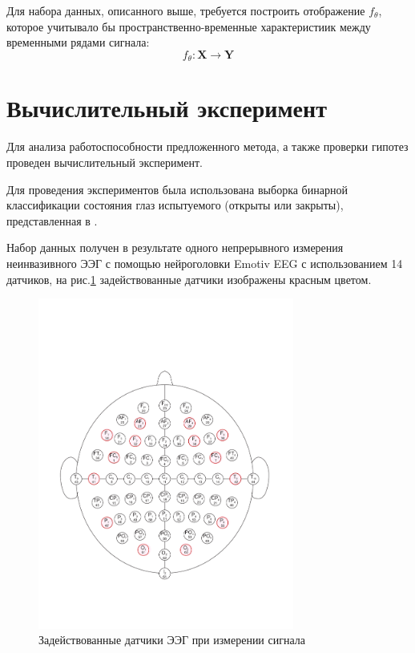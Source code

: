\documentclass[a4paper, 12pt]{extarticle}
\begin{document}
Для набора данных, описанного выше, требуется построить отображение $f_\theta$, которое учитывало 
бы пространственно-временные характеристиик между временными рядами сигнала:
$$f_\theta: \bm{X} \rightarrow \bm{Y}$$ 



\section{Вычислительный эксперимент}

Для анализа работоспособности предложенного метода, а также проверки гипотез
проведен вычислительный эксперимент.

Для проведения экспериментов была использована выборка бинарной классификации состояния глаз 
испытуемого (открыты или закрыты), представленная в \citep{misc_eeg_eye_state_264}.

Набор данных получен в результате одного непрерывного измерения неинвазивного ЭЭГ с 
помощью нейроголовки Emotiv EEG с использованием 14 датчиков, на рис.\ref{fig:1} задействованные датчики
изображены красным цветом. 
\begin{figure}[h]
	\centering
	\includegraphics[width=0.75\textwidth]{64_channel_sharbrough.pdf}
	\caption{Задействованные датчики ЭЭГ при измерении сигнала}
	\label{fig:1}
\end{figure}
\end{document}
